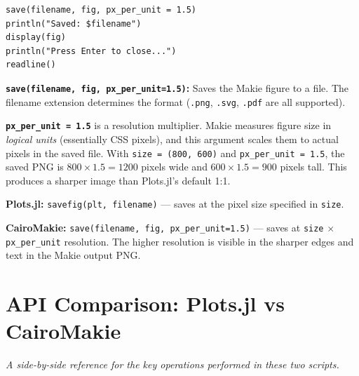 \documentclass[12pt, a4paper]{article}
\newcommand{\cd}[1]{\texttt{#1}}
\begin{document}
\begin{verbatim}
save(filename, fig, px_per_unit = 1.5)
println("Saved: $filename")
display(fig)
println("Press Enter to close...")
readline()
\end{verbatim}

\textbf{\cd{save(filename, fig, px\_per\_unit=1.5)}:}
Saves the Makie figure to a file.
The filename extension determines the format (\cd{.png},
\cd{.svg}, \cd{.pdf} are all supported).

\textbf{\cd{px\_per\_unit = 1.5}}
is a resolution multiplier.
Makie measures figure size in \emph{logical units}
(essentially CSS pixels), and this argument scales them
to actual pixels in the saved file.
With \cd{size = (800, 600)} and \cd{px\_per\_unit = 1.5},
the saved PNG is $800 \times 1.5 = 1200$ pixels wide and
$600 \times 1.5 = 900$ pixels tall.
This produces a sharper image than Plots.jl's default 1:1.

\begin{diffbox}
\textbf{Plots.jl:} \cd{savefig(plt, filename)}
--- saves at the pixel size specified in \cd{size}.

\textbf{CairoMakie:} \cd{save(filename, fig, px\_per\_unit=1.5)}
--- saves at \cd{size} $\times$ \cd{px\_per\_unit} resolution.
The higher resolution is visible in the sharper edges and
text in the Makie output PNG.
\end{diffbox}


\section{API Comparison: Plots.jl vs CairoMakie}

\textit{A side-by-side reference for the key operations
performed in these two scripts.}
\end{document}
